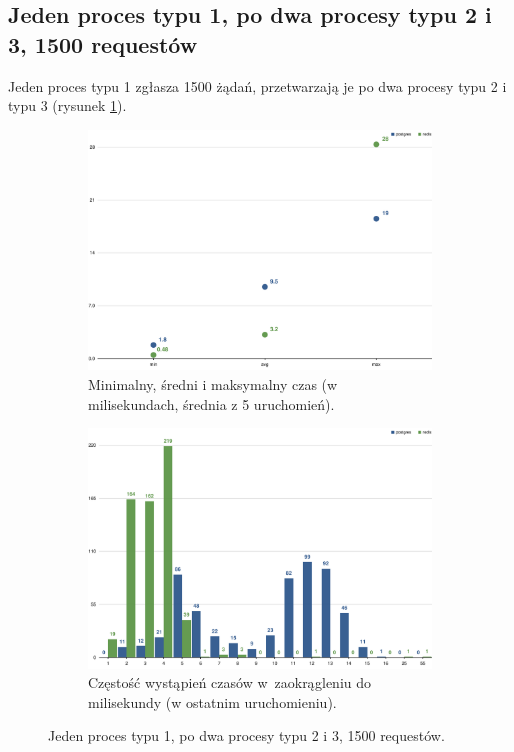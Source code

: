 \documentclass[a4paper,11pt]{article}
\begin{document}
\subsection{Jeden proces typu 1, po dwa procesy typu 2 i 3, 1500 requestów}

Jeden proces typu 1 zgłasza 1500 żądań, przetwarzają je po dwa procesy typu 2 i typu 3 (rysunek \ref{1-2-2}).
\begin{figure}[h!]
  \centering
  \begin{subfigure}{\textwidth}
    \centering
    \includegraphics[width=\textwidth]{charts/1-2-2-min-avg-max}
    \caption{Minimalny, średni i maksymalny czas (w milisekundach, średnia z 5 uruchomień).}
  \end{subfigure}
  \begin{subfigure}{\textwidth}
    \centering
    \includegraphics[width=\textwidth]{charts/1-2-2-grouped}
    \caption{Częstość wystąpień czasów w~zaokrągleniu do milisekundy (w ostatnim uruchomieniu).}
  \end{subfigure}
  \caption{Jeden proces typu 1, po dwa procesy typu 2 i 3, 1500 requestów.}
  \label{1-2-2}
\end{figure}
\end{document}
